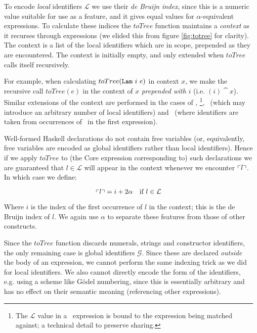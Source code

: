 To encode \emph{local} identifiers $\mathcal{L}$ we use their \emph{de Bruijn index}, since this is a numeric value suitable for use as a feature, and it gives equal values for $\alpha$-equivalent expressions. To calculate these indices the $toTree$ function maintains a \emph{context} as it recurses through expressions (we elided this from figure \ref{fig:totree} for clarity). The context is a list of the local identifiers which are in scope, prepended as they are encountered. The context is initially empty, and only extended when $toTree$ calls itself recursively.

For example, when calculating $toTree(\texttt{Lam}\ i\ e)$ in context $x$, we make the recursive call $toTree(e)$ in the context of \emph{$x$ prepended with $i$} (i.e. $(i) \cat x$). Similar extensions of the context are performed in the cases of \CBind, \CCase\footnote{The $\mathcal{L}$ value in a \CCase\ expression is bound to the expression being matched against; a technical detail to preserve sharing.}, \CAlt\ (which may introduce an arbitrary number of local identifiers) and \CLet\ (where identifiers are taken from occurrences of \CBind\ in the first expression).

Well-formed Haskell declarations do not contain free variables (or, equivalently, free variables are encoded as global identifiers rather than local identifiers). Hence if we apply $toTree$ to (the Core expression corresponding to) such declarations we are guaranteed that $l \in \mathcal{L}$ will appear in the context whenever we encounter $\left\ulcorner l \right\urcorner$. \iffalse NOTE: Can we prove this, or would it just be an exercise in formalising Haskell? \fi In which case we define:

\begin{equation}
  \left\ulcorner l \right\urcorner = i + 2 \alpha \quad \text{if $l \in \mathcal{L}$}
\end{equation}

Where $i$ is the index of the first occurrence of $l$ in the context; this is the de Bruijn index of $l$. We again use $\alpha$ to separate these features from those of other constructs.

Since the $toTree$ function discards numerals, strings and constructor identifiers, the only remaining case is global identifiers $\mathcal{G}$. Since these are declared \emph{outside} the body of an expression, we cannot perform the same indexing trick as we did for local identifiers. We also cannot directly encode the form of the identifiers, e.g. using a scheme like G{\"o}del numbering, since this is essentially arbitrary and has no effect on their semantic meaning (referencing other expressions).

